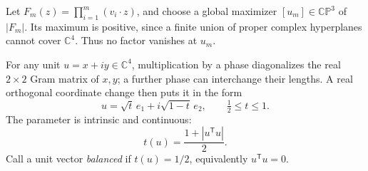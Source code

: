 \documentclass[11pt]{article}
\theoremstyle{remark}
\newcommand{\C}{\mathbb C}
\newcommand{\CP}{\mathbb{CP}}
\begin{document}
Let $F_m(z)=\prod_{i=1}^m(v_i\cdot z)$, and choose a global maximizer $[u_m]\in\CP^3$ of $|F_m|$. Its maximum is positive, since a finite union of proper complex hyperplanes cannot cover $\C^4$. Thus no factor vanishes at $u_m$.

For any unit $u=x+iy\in\C^4$, multiplication by a phase diagonalizes the real $2\times2$ Gram matrix of $x,y$; a further phase can interchange their lengths. A real orthogonal coordinate change then puts it in the form
\begin{equation}\label{eq:canonical}
 u=\sqrt t\,e_1+i\sqrt{1-t}\,e_2,\qquad \tfrac12\leq t\leq1.
\end{equation}
The parameter is intrinsic and continuous:
\begin{equation}\label{eq:t}
 t(u)=\frac{1+|u^{\mathsf T}u|}{2}.
\end{equation}
Call a unit vector \emph{balanced} if $t(u)=1/2$, equivalently $u^{\mathsf T}u=0$.
\end{document}
